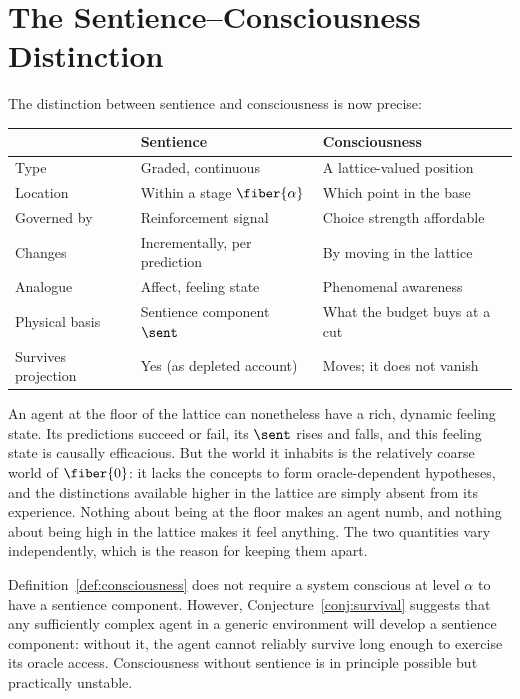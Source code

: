 \section{The Sentience--Consciousness Distinction}

The distinction between sentience and consciousness is now precise:

\begin{center}
\renewcommand{\arraystretch}{1.4}
\small
\begin{tabular}{lll}
\toprule
& \textbf{Sentience} & \textbf{Consciousness} \\
\midrule
Type & Graded, continuous & A lattice-valued position \\
Location & Within a stage $\fiber{\alpha}$ & Which point in the base \\
Governed by & Reinforcement signal & Choice strength affordable \\
Changes & Incrementally, per prediction & By moving in the lattice \\
Analogue & Affect, feeling state & Phenomenal awareness \\
Physical basis & Sentience component $\sent$ & What the budget buys at a cut \\
Survives projection & Yes (as depleted account) & Moves; it does not vanish \\
\bottomrule
\end{tabular}
\end{center}

\begin{remark}
An agent at the floor of the lattice can nonetheless have a rich,
dynamic feeling state.
Its predictions succeed or fail, its $\sent$ rises and falls, and this
feeling state is causally efficacious.
But the world it inhabits is the relatively coarse world of
$\fiber{0}$: it lacks the concepts to form oracle-dependent
hypotheses, and the distinctions available higher in the lattice are
simply absent from its experience.
Nothing about being at the floor makes an agent numb, and nothing about
being high in the lattice makes it feel anything.
The two quantities vary independently, which is the reason for keeping
them apart.
\end{remark}

\begin{remark}
Definition~\ref{def:consciousness} does not require a system
conscious at level $\alpha$ to have a sentience component.
However, Conjecture~\ref{conj:survival} suggests that any
sufficiently complex agent in a generic environment will develop
a sentience component: without it, the agent cannot reliably
survive long enough to exercise its oracle access.
Consciousness without sentience is in principle possible but
practically unstable.
\end{remark}

